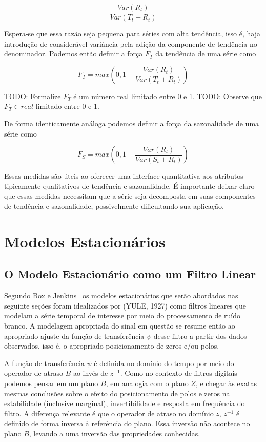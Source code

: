 $$ \frac{Var(R_t)}{Var(T_t + R_t)} $$

Espera-se que essa razão seja pequena para séries com alta tendência, isso é,
haja introdução de considerável variância pela adição da componente de
tendência no denominador. Podemos então definir a força $F_T$ da tendência de
uma série como

$$ F_T = max\left(0, 1 - \frac{Var(R_t)}{Var(T_t + R_t)}\right) $$

TODO: Formalize $F_T$ é um número real limitado entre 0 e 1.
TODO: Observe que $F_T \in real$ limitado entre 0 e 1.

De forma identicamente análoga podemos definir a força da sazonalidade de uma
série como

$$ F_S = max\left(0, 1 - \frac{Var(R_t)}{Var(S_t + R_t)}\right) $$

Essas medidas são úteis ao oferecer uma interface quantitativa aos atributos
tipicamente qualitativos de tendência e sazonalidade. É importante deixar
claro que essas medidas necessitam que a série seja decomposta em suas
componentes de tendência e sazonalidade, possivelmente dificultando sua
aplicação.

\section{Modelos Estacionários}

\subsection{O Modelo Estacionário como um Filtro Linear}

Segundo Box e Jenkins~\cite[capítulo~1.2.1]{box} os modelos estacionários que
serão abordados nas seguinte seções foram idealizados por (YULE, 1927) como
filtros lineares que modelam a série temporal de interesse por meio do
processamento de ruído branco. A modelagem apropriada do sinal em questão se
resume então ao apropriado ajuste da função de transferência $\psi$ desse
filtro a partir dos dados observados, isso é, o apropriado posicionamento de
zeros e/ou polos.

A função de transferência $\psi$ é definida no domínio do tempo por meio do
operador de atraso $B$ ao invés de $z^{-1}$. Como no contexto de filtros
digitais podemos pensar em um plano $B$, em analogia com o plano $Z$, e chegar às
exatas mesmas conclusões sobre o efeito do posicionamento de polos e zeros na
estabilidade (inclusive marginal), invertibilidade e resposta em frequência do
filtro. A diferença relevante é que o operador de atraso no domínio $z$,
$z^{-1}$ é definido de forma inversa à referência do plano. Essa inversão não
acontece no plano $B$, levando a uma inversão das propriedades conhecidas.

